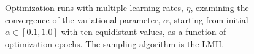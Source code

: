 \begin{figure}[!htb]
\qquad
{}
\caption{Optimization runs with multiple learning rates, $\eta$, examining the convergence of the variational parameter, $\alpha$, starting from initial $\alpha\in[0.1, 1.0]$ with ten equidistant values, as a function of optimization epochs. The sampling algorithm is the LMH.}
\label{fig:alpha_epoch_lmh}
\end{figure}


